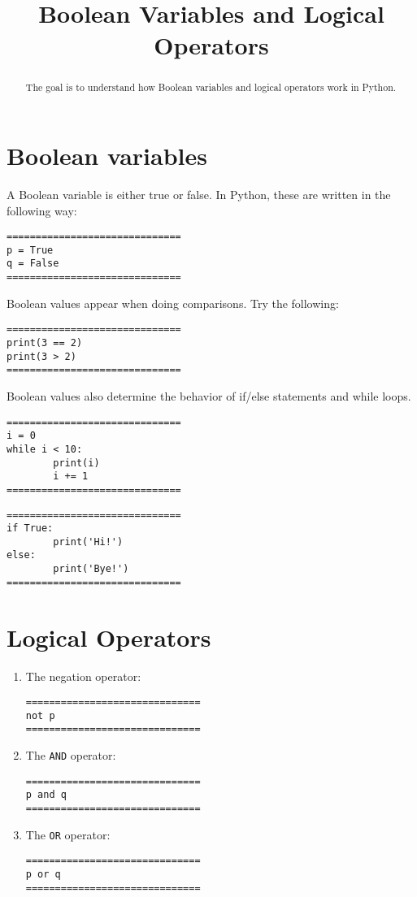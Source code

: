 \documentclass{ximera}
\title{Boolean Variables and Logical Operators}
\begin{document}
\begin{abstract}
The goal is to understand how Boolean variables and logical operators work in Python.
\end{abstract}
\maketitle

\section{Boolean variables}

A Boolean variable is either true or false. In Python, these are written in the following way:

\begin{verbatim}
==============================
p = True
q = False
==============================
\end{verbatim}

Boolean values appear when doing comparisons. Try the following:
\begin{verbatim}
==============================
print(3 == 2)
print(3 > 2)
==============================
\end{verbatim}

Boolean values also determine the behavior of if/else statements and while loops.
\begin{verbatim}
==============================
i = 0
while i < 10:
        print(i)
        i += 1
==============================
\end{verbatim}

\begin{verbatim}
==============================
if True:
        print('Hi!')
else:
        print('Bye!')
==============================
\end{verbatim}

\section{Logical Operators}

\begin{enumerate}
    \item The negation operator:
\begin{verbatim}
==============================
not p
==============================
\end{verbatim}

    \item The \verb|AND| operator:
\begin{verbatim}
==============================
p and q
==============================
\end{verbatim}

    \item The \verb|OR| operator:
\begin{verbatim}
==============================
p or q
==============================
\end{verbatim}
\end{enumerate}
\end{document}
